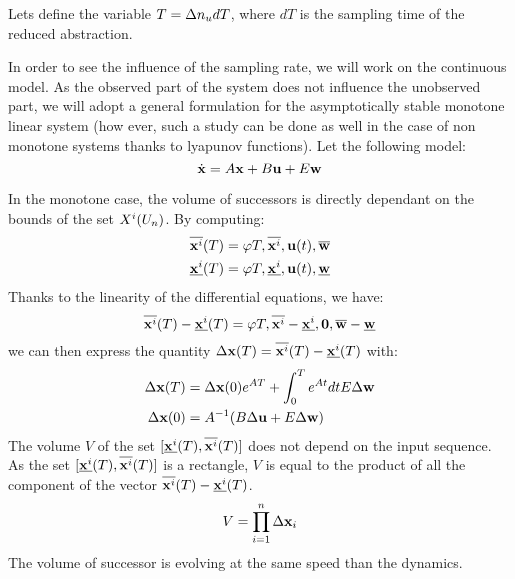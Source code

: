 \renewcommand{\dt}{dT}
Lets define the variable $T = \Ninputs\dt$, where $\dt$ is the sampling time of the reduced abstraction.

In order to see the influence of the sampling rate, we will work on the continuous model. 
As the observed part of the system does not influence the unobserved part, we will adopt a general formulation for the asymptotically stable monotone linear system (how ever, such a study can be done as well in the case of non monotone systems thanks to lyapunov functions).
Let the following model:
\begin{equation}
\dot{ \mathbf{x}} = A  \mathbf{x} + B  \mathbf{u} + E  \mathbf{w}
\end{equation}

In the monotone case, the volume of successors is directly dependant on the bounds of the set $X^i(U_n)$.
By computing:
\newcommand{\xs}{\msup{\xunobs}}
\renewcommand{\xi}{\minf{\xunobs}}
\newcommand{\Dx}{\Delta \x}
\newcommand{\Du}{\Delta \u}
\newcommand{\Dw}{\Delta \w}
\begin{equation}
\begin{split}
\xs(T) &= \traj{T,\xs,\u(t),\msup{\w}} \\
\xi(T) &= \traj{T,\xi,\u(t),\minf{\w}} \\
\end{split}
\end{equation}
Thanks to the linearity of the differential equations, we have:
\begin{equation}
\overline{ \mathbf{x}^i}(T) - \underline{ \mathbf{x}^i}(T)
= \varphi{T,
\overline{\ensuremath{ \mathbf{x}}^i}- \underline{\ensuremath{ \mathbf{x}}^i}
,\ensuremath{ \mathbf{0}},
\overline{\ensuremath{ \mathbf{w}}} - \underline{\ensuremath{ \mathbf{w}}}
}
\end{equation}
we can then express the quantity $\Dx(T) = \msup{\xunobs}(T) - \minf{\xunobs}(T)$ with:
\begin{equation}\label{eq:vect_succ}
\begin{split}
\Dx(T) &= \Dx(0) \exp{A T} + \int_{0}^{T} \exp{A t} dt E \Dw \\
\Dx(0) &= A^{-1}(B \Du + E \Dw) \\
\end{split}
\end{equation}
The volume $V$ of the set $[\xi(T),\xs(T)]$ does not depend on the input sequence. As the set $[\xi(T),\xs(T)]$  is a rectangle, $V$ is equal to the product of all the component of the vector $\xs(T) - \xi(T)$.
\begin{equation}
V = \prod_{i=1}^{n} \Dx_i
\end{equation}
The volume of successor is evolving at the same speed than the dynamics.


